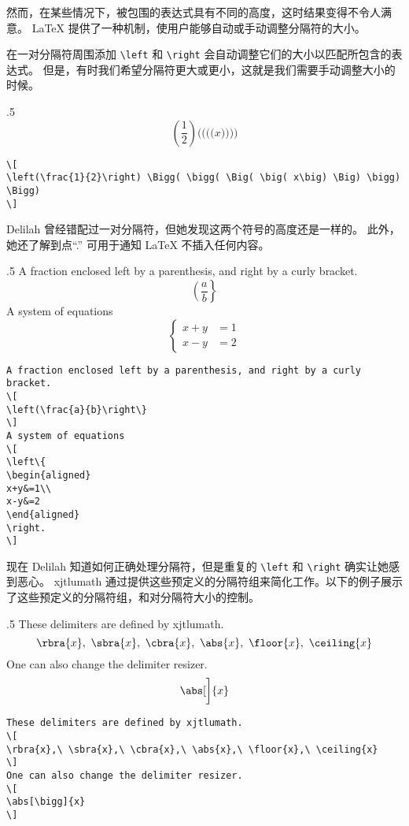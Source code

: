 然而，在某些情况下，被包围的表达式具有不同的高度，这时结果变得不令人满意。 \LaTeX{} 提供了一种机制，使用户能够自动或手动调整分隔符的大小。

在一对分隔符周围添加 \verb=\left= 和 \verb=\right= 会自动调整它们的大小以匹配所包含的表达式。 但是，有时我们希望分隔符更大或更小，这就是我们需要手动调整大小的时候。
\begin{parexammar}{.5\textandmarginlen}{
\[
\left( \frac{1}{2} \right) 
\Bigg( \bigg( \Big( \big( x\big) \Big) \bigg) \Bigg)
\]
}
\begin{lstlisting}
\[
\left(\frac{1}{2}\right) \Bigg( \bigg( \Big( \big( x\big) \Big) \bigg) \Bigg)
\]
\end{lstlisting}
\end{parexammar}

Delilah 曾经错配过一对分隔符，但她发现这两个符号的高度还是一样的。 此外，她还了解到点“.” 可用于通知 \LaTeX{} 不插入任何内容。
\begin{parexammar}{.5\textandmarginlen}{
A fraction enclosed left by a parenthesis, and right by a curly bracket.
\[
\left(\frac{a}{b}\right\}
\]
A system of equations
\[
\left\{
\begin{aligned}
x+y&=1\\
x-y&=2
\end{aligned}
\right.
\]
}
\begin{lstlisting}
A fraction enclosed left by a parenthesis, and right by a curly bracket.
\[
\left(\frac{a}{b}\right\}
\]
A system of equations
\[
\left\{
\begin{aligned}
x+y&=1\\
x-y&=2
\end{aligned}
\right.
\]
\end{lstlisting}
\end{parexammar}

现在 Delilah 知道如何正确处理分隔符，但是重复的 \verb=\left= 和 \verb=\right= 确实让她感到恶心。 xjtlumath 通过提供这些预定义的分隔符组来简化工作。以下的例子展示了这些预定义的分隔符组，和对分隔符大小的控制。
\begin{parexammar}{.5\textandmarginlen}{
These delimiters are defined by xjtlumath.
\[
\rbra{x},\ \sbra{x},\ \cbra{x},\ \abs{x},\ \floor{x},\ \ceiling{x}
\]
One can also change the delimiter resizer.
\[
\abs[\bigg]{x}
\]
}
\begin{lstlisting}
These delimiters are defined by xjtlumath.
\[
\rbra{x},\ \sbra{x},\ \cbra{x},\ \abs{x},\ \floor{x},\ \ceiling{x}
\]
One can also change the delimiter resizer.
\[
\abs[\bigg]{x}
\]
\end{lstlisting}
\end{parexammar}

